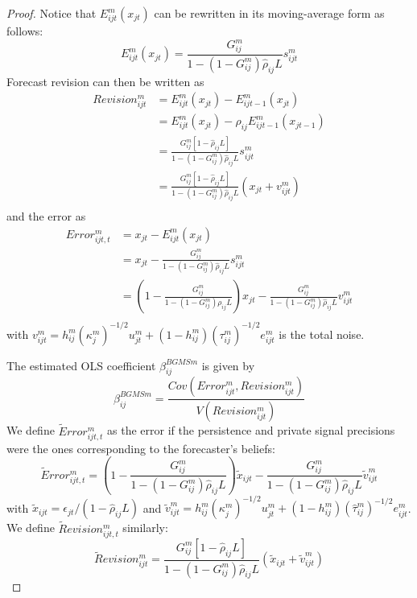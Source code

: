 \begin{proof}

Notice that $E_{ijt}^m(x_{jt})$ can be rewritten in its moving-average form as follows:
\begin{equation}E_{ijt}^m(x_{jt})=\frac{G_{ij}^m}{1-(1-G_{ij}^m)\hat\rho_{ij}L}s_{ijt}^m\label{eq:ma}\end{equation}
Forecast revision can then be written as
\begin{equation}\begin{array}{ll}Revision_{ijt}^m&=E_{ijt}^m(x_{jt})-E_{ijt-1}^m(x_{jt})\\
																								&=E_{ijt}^m(x_{jt})-\hat\rho_{ij}E_{ijt-1}^m(x_{jt-1})\\
																								&=\frac{G_{ij}^m[1-\hat\rho_{ij}L]}{1-(1-G_{ij}^m)\hat\rho_{ij}L}s_{ijt}^m\\
																								&=\frac{G_{ij}^m[1-\hat\rho_{ij}L]}{1-(1-G_{ij}^m)\hat\rho_{ij}L}(x_{jt}+v_{ijt}^m)\\
																								\end{array}\label{eq:revision2}\end{equation}
and the error as
\begin{equation}\begin{array}{ll}Error_{ijt,t}^m&=x_{jt}-E_{ijt}^m(x_{jt})\\
																							&=x_{jt}-\frac{G_{ij}^m}{1-(1-G_{ij}^m)\hat\rho_{ij}L}s_{ijt}^m\\
																							&=\left(1-\frac{G_{ij}^m}{1-(1-G_{ij}^m)\rho_{ij}L}\right)x_{jt}-\frac{G_{ij}^m}{1-(1-G_{ij}^m)\hat\rho_{ij}L}v_{ijt}^m\\
																								\end{array}\label{eq:error2}\end{equation}
with $v_{ijt}^m=h_{ij}^m(\kappa_j^m)^{-1/2}u_{jt}^m+(1-h_{ij}^m)(\tau_{ij}^m)^{-1/2}e_{ijt}^m$ is the total noise.


The estimated OLS coefficient $\beta^{BGMSm}_{ij}$ is given by
$$\beta^{BGMSm}_{ij}  = \frac{Cov\left(Error_{ijt}^m,Revision_{ijt}^m\right)}{V\left(Revision_{ijt}^m\right)}$$
We define $\tilde Error_{ijt,t}^m$ as the error if the persistence and private signal precisions were the ones corresponding to the forecaster's beliefs:
\begin{equation}\tilde Error_{ijt,t}^m=\left(1-\frac{G_{ij}^m}{1-(1-G_{ij}^m)   \hat\rho_{ij}   L}\right)\tilde x_{ijt}-\frac{G_{ij}^m}{1-(1-G_{ij}^m)\hat\rho_{ij}L}\tilde v_{ijt}^m\label{eq:tildeerror}\end{equation}
with $\tilde x_{ijt}=\epsilon_{jt}/(1-\hat\rho_{ij}L)$ and $\tilde v_{ijt}^m=h_{ij}^m(\kappa_j^m)^{-1/2}u_{jt}^m+(1-h_{ij}^m)(\hat\tau_{ij}^m)^{-1/2}e_{ijt}^m$. We define $\tilde Revision_{ijt,t}^m$ similarly:
$$\tilde Revision_{ijt}^m=\frac{G_{ij}^m[1-\hat\rho_{ij}L]}{1-(1-G_{ij}^m)\hat\rho_{ij}L}(\tilde x_{ijt}+\tilde v_{ijt}^m)$$


\end{proof}

